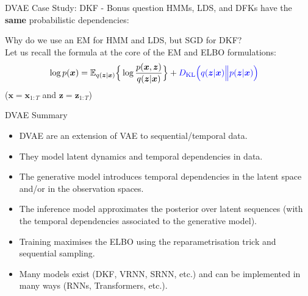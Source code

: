 \documentclass{beamer}
\newcommand{\bs}[1]{\boldsymbol{#1}}
\begin{document}
\begin{frame}{DVAE Case Study: DKF - Bonus question}
HMMs, LDS, and DFKs have the \textbf{same} probabilistic dependencies:
\begin{center}
\end{center}
Why do we use an EM for HMM and LDS, but SGD for DKF?\pause \vspace{3mm}\\Let us recall the formula at the core of the EM and ELBO formulations:
 \begin{align}
\log p(\bs{x}) &= \mathbb{E}_{q(\bs{z}|\bs{x})}\Big\{\log \frac{p(\bs{x},\bs{z})}{q(\bs{z}|\bs{x})}\Big\} + {\color{blue} D_{\text{KL}}\Big(q(\bs{z}|\bs{x})\Big\lVert p(\bs{z}|\bs{x})\Big)}
\end{align}
($\bs{x}=\bs{x}_{1:T}$ and $\bs{z}=\bs{z}_{1:T}$)
\end{frame}

\begin{frame}{DVAE Summary}
\begin{itemize}
  \item DVAE are an extension of VAE to sequential/temporal data.
  \item They model latent dynamics and temporal dependencies in data.
  \item The generative model introduces temporal dependencies in the latent space and/or in the observation spaces.
  \item The inference model approximates the posterior over latent sequences (with the temporal dependencies associated to the generative model).
  \item Training maximises the ELBO using the reparametrisation trick and sequential sampling.
  \item Many models exist (DKF, VRNN, SRNN, etc.) and can be implemented in many ways (RNNs, Transformers, etc.).
\end{itemize}
\end{frame}
\end{document}
